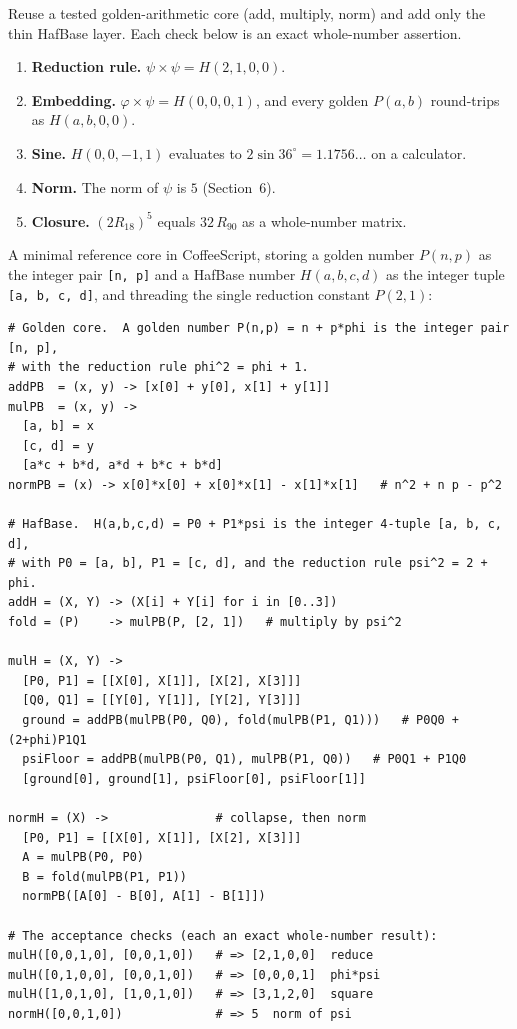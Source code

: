 \documentclass[11pt]{article}
\newcommand{\phigr}{\varphi}
\newcommand{\Hn}[4]{H(#1,#2,#3,#4)}
\newcommand{\Pn}[2]{P(#1,#2)}
\begin{document}
Reuse a tested golden-arithmetic core (add, multiply, norm) and add only the thin HafBase layer.
Each check below is an exact whole-number assertion.

\begin{enumerate}
\item \textbf{Reduction rule.} $\psi\times\psi = \Hn{2}{1}{0}{0}$.
\item \textbf{Embedding.} $\phigr\times\psi = \Hn{0}{0}{0}{1}$, and every golden $\Pn{a}{b}$ round-trips
as $\Hn{a}{b}{0}{0}$.
\item \textbf{Sine.} $\Hn{0}{0}{-1}{1}$ evaluates to $2\sin 36^\circ = 1.1756\ldots$ on a calculator.
\item \textbf{Norm.} The norm of $\psi$ is $5$ (Section~6).
\item \textbf{Closure.} $(2R_{18})^5$ equals $32\,R_{90}$ as a whole-number matrix.
\end{enumerate}

A minimal reference core in CoffeeScript, storing a golden number $\Pn{n}{p}$ as the integer pair
\verb|[n, p]| and a HafBase number $\Hn{a}{b}{c}{d}$ as the integer tuple \verb|[a, b, c, d]|, and
threading the single reduction constant $\Pn{2}{1}$:

\begin{Verbatim}
# Golden core.  A golden number P(n,p) = n + p*phi is the integer pair [n, p],
# with the reduction rule phi^2 = phi + 1.
addPB  = (x, y) -> [x[0] + y[0], x[1] + y[1]]
mulPB  = (x, y) ->
  [a, b] = x
  [c, d] = y
  [a*c + b*d, a*d + b*c + b*d]
normPB = (x) -> x[0]*x[0] + x[0]*x[1] - x[1]*x[1]   # n^2 + n p - p^2

# HafBase.  H(a,b,c,d) = P0 + P1*psi is the integer 4-tuple [a, b, c, d],
# with P0 = [a, b], P1 = [c, d], and the reduction rule psi^2 = 2 + phi.
addH = (X, Y) -> (X[i] + Y[i] for i in [0..3])
fold = (P)    -> mulPB(P, [2, 1])   # multiply by psi^2

mulH = (X, Y) ->
  [P0, P1] = [[X[0], X[1]], [X[2], X[3]]]
  [Q0, Q1] = [[Y[0], Y[1]], [Y[2], Y[3]]]
  ground = addPB(mulPB(P0, Q0), fold(mulPB(P1, Q1)))   # P0Q0 + (2+phi)P1Q1
  psiFloor = addPB(mulPB(P0, Q1), mulPB(P1, Q0))   # P0Q1 + P1Q0
  [ground[0], ground[1], psiFloor[0], psiFloor[1]]

normH = (X) ->               # collapse, then norm
  [P0, P1] = [[X[0], X[1]], [X[2], X[3]]]
  A = mulPB(P0, P0)
  B = fold(mulPB(P1, P1))
  normPB([A[0] - B[0], A[1] - B[1]])

# The acceptance checks (each an exact whole-number result):
mulH([0,0,1,0], [0,0,1,0])   # => [2,1,0,0]  reduce
mulH([0,1,0,0], [0,0,1,0])   # => [0,0,0,1]  phi*psi
mulH([1,0,1,0], [1,0,1,0])   # => [3,1,2,0]  square
normH([0,0,1,0])             # => 5  norm of psi
\end{Verbatim}
\end{document}
